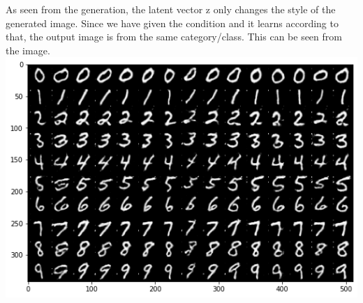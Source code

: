 As seen from the generation, the latent vector z only changes the style
of the generated image. Since we have given the condition and it learns
according to that, the output image is from the same category/class.
This can be seen from the image.
\includegraphics{./images/Pasted image 20231229115737.png}
